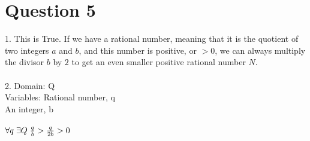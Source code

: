 \documentclass{article}
\begin{document}
    \section*{Question 5}
    1. This is True. If we have a rational number, meaning that it is the quotient of two integers $a$ and $b$, and this number is positive, or $>0$, we can always multiply the divisor $b$ by $2$ to get an even smaller positive rational number $N$. \\ \\
   2. Domain: Q \\
   Variables: Rational number, q \\
   An integer, b \\ \\
   $\forall q \hspace{0.1cm} \exists Q \hspace{0.1cm} \frac{q}{b} > \frac{q}{2b} > 0$ \\

   
\end{document}
